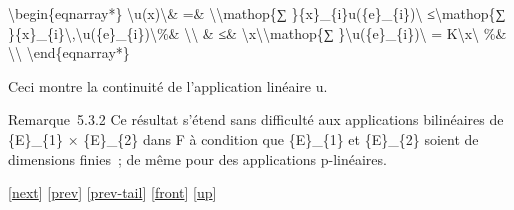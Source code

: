 \documentclass[]{article}
\begin{document}
\textbackslash{}begin\{eqnarray*\}
\textbackslash{}\textbar{}u(x)\textbackslash{}\textbar{}\& =\&
\textbackslash{}\textbar{}\textbackslash{}mathop\{∑
\}\{x\}\_\{i\}u(\{e\}\_\{i\})\textbackslash{}\textbar{}
≤\textbackslash{}mathop\{∑
\}\textbar{}\{x\}\_\{i\}\textbar{}\textbackslash{},\textbackslash{}\textbar{}u(\{e\}\_\{i\})\textbackslash{}\textbar{}\%\&
\textbackslash{}\textbackslash{} \& ≤\&
\textbackslash{}\textbar{}x\textbackslash{}\textbar{}\textbackslash{}mathop\{∑
\}\textbackslash{}\textbar{}u(\{e\}\_\{i\})\textbackslash{}\textbar{} =
K\textbackslash{}\textbar{}x\textbackslash{}\textbar{} \%\&
\textbackslash{}\textbackslash{} \textbackslash{}end\{eqnarray*\}

Ceci montre la continuité de l'application linéaire u.

Remarque~5.3.2 Ce résultat s'étend sans difficulté aux applications
bilinéaires de \{E\}\_\{1\} × \{E\}\_\{2\} dans F à condition que
\{E\}\_\{1\} et \{E\}\_\{2\} soient de dimensions finies~; de même pour
des applications p-linéaires.

{[}\href{coursse30.html}{next}{]} {[}\href{coursse28.html}{prev}{]}
{[}\href{coursse28.html\#tailcoursse28.html}{prev-tail}{]}
{[}\href{coursse29.html}{front}{]}
{[}\href{coursch6.html\#coursse29.html}{up}{]}
\end{document}
